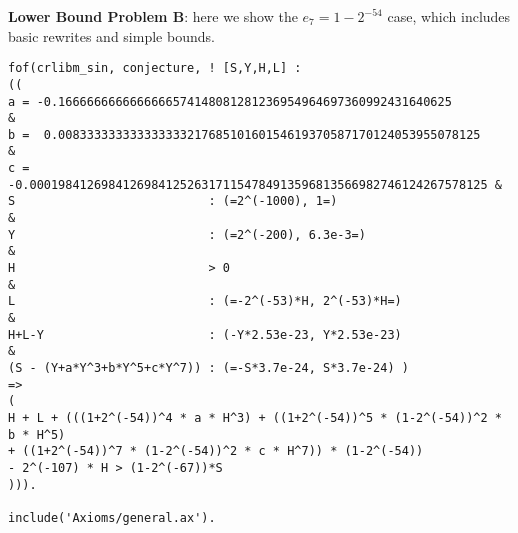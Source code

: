 \documentclass{fac}
\begin{document}
\noindent \textbf{Lower Bound Problem B}: here we show the $e_7=1-2^{-54}$ case, which includes basic rewrites and simple bounds.
\begin{lstlisting}
fof(crlibm_sin, conjecture, ! [S,Y,H,L] : 
((
a = -0.1666666666666666574148081281236954964697360992431640625          &
b =  0.00833333333333333321768510160154619370587170124053955078125      &
c = -0.0001984126984126984125263171154784913596813566982746124267578125 &
S                           : (=2^(-1000), 1=)                          &  
Y                           : (=2^(-200), 6.3e-3=)                      &  
H                           > 0                                         &
L                           : (=-2^(-53)*H, 2^(-53)*H=)                 &
H+L-Y                       : (-Y*2.53e-23, Y*2.53e-23)                 &
(S - (Y+a*Y^3+b*Y^5+c*Y^7)) : (=-S*3.7e-24, S*3.7e-24) )
=>
( 
H + L + (((1+2^(-54))^4 * a * H^3) + ((1+2^(-54))^5 * (1-2^(-54))^2 * b * H^5) 
+ ((1+2^(-54))^7 * (1-2^(-54))^2 * c * H^7)) * (1-2^(-54))
- 2^(-107) * H > (1-2^(-67))*S
))).

include('Axioms/general.ax').
\end{lstlisting}
\end{document}
